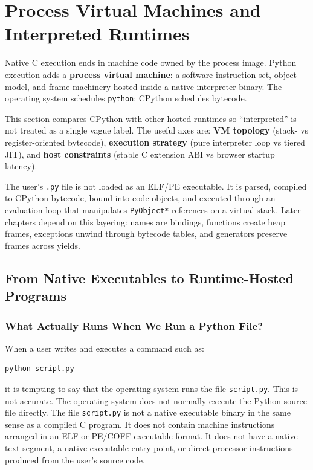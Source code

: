 \documentclass[a4paper,twoside]{report}
\begin{document}
\section{Process Virtual Machines and Interpreted Runtimes}

Native C execution ends in machine code owned by the process image. Python execution adds a \textbf{process virtual machine}: a software instruction set, object model, and frame machinery hosted inside a native interpreter binary. The operating system schedules \texttt{python}; CPython schedules bytecode.

This section compares CPython with other hosted runtimes so ``interpreted'' is not treated as a single vague label. The useful axes are: \textbf{VM topology} (stack- vs register-oriented bytecode), \textbf{execution strategy} (pure interpreter loop vs tiered JIT), and \textbf{host constraints} (stable C extension ABI vs browser startup latency).

The user's \texttt{.py} file is not loaded as an ELF/PE executable. It is parsed, compiled to CPython bytecode, bound into code objects, and executed through an evaluation loop that manipulates \texttt{PyObject*} references on a virtual stack. Later chapters depend on this layering: names are bindings, functions create heap frames, exceptions unwind through bytecode tables, and generators preserve frames across yields.


\subsection{From Native Executables to Runtime-Hosted Programs}


\subsubsection{What Actually Runs When We Run a Python File?}

When a user writes and executes a command such as:

\begin{verbatim}
python script.py
\end{verbatim}

it is tempting to say that the operating system runs the file \texttt{script.py}. This is not accurate. The operating system does not normally execute the Python source file directly. The file \texttt{script.py} is not a native executable binary in the same sense as a compiled C program. It does not contain machine instructions arranged in an ELF or PE/COFF executable format. It does not have a native text segment, a native executable entry point, or direct processor instructions produced from the user's source code.
\end{document}
